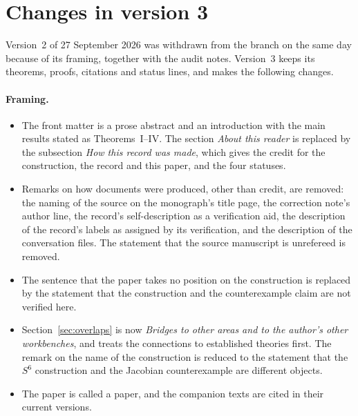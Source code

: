 \section{Changes in version 3}\label{app:changes}

Version~2 of 27 September 2026 was withdrawn from the branch on the same day because of its framing, together with the audit notes. Version~3 keeps its theorems, proofs, citations and status lines, and makes the following changes.

\paragraph{Framing.}
\begin{itemize}
\item The front matter is a prose abstract and an introduction with the main results stated as Theorems~I--IV. The section \emph{About this reader} is replaced by the subsection \emph{How this record was made}, which gives the credit for the construction, the record and this paper, and the four statuses.
\item Remarks on how documents were produced, other than credit, are removed: the naming of the source on the monograph's title page, the correction note's author line, the record's self-description as a verification aid, the description of the record's labels as assigned by its verification, and the description of the conversation files. The statement that the source manuscript is unrefereed is removed.
\item The sentence that the paper takes no position on the construction is replaced by the statement that the construction and the counterexample claim are not verified here.
\item Section~\ref{sec:overlaps} is now \emph{Bridges to other areas and to the author's other workbenches}, and treats the connections to established theories first. The remark on the name of the construction is reduced to the statement that the $S^6$ construction and the Jacobian counterexample are different objects.
\item The paper is called a paper, and the companion texts are cited in their current versions.
\end{itemize}

